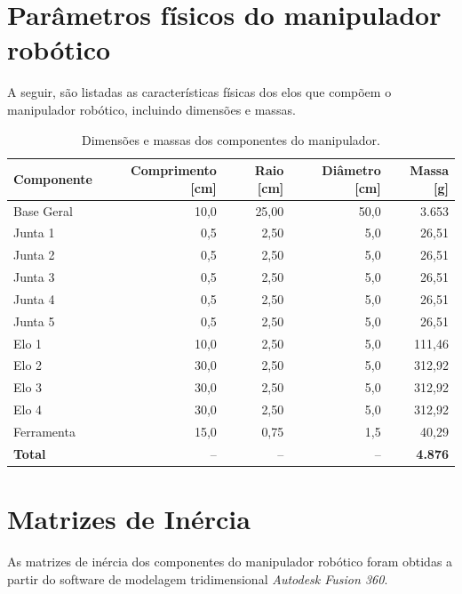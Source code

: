 \section{Parâmetros físicos do manipulador robótico}
\label{ap:ApendiceA}
A seguir, são listadas as características físicas dos elos que compõem o manipulador robótico, incluindo dimensões e massas.


\begin{table}[H]
\centering
{\setlength{\tabcolsep}{6pt} 
\caption{Dimensões e massas dos componentes do manipulador.}
\label{tab:dimensoes_massas_cm_g}
\begin{tabular}{l rrrr}
\hline
\textbf{Componente} & \textbf{Comprimento [cm]} & \textbf{Raio [cm]} & \textbf{Diâmetro [cm]} & \textbf{Massa [g]} \\
\hline
Base Geral   & 10,0   & 25,00  & 50,0  & 3.653   \\
Junta 1      & 0,5  & 2,50   & 5,0   & 26,51  \\
Junta 2      & 0,5  & 2,50   & 5,0   & 26,51  \\
Junta 3      & 0,5  & 2,50   & 5,0   & 26,51  \\
Junta 4      & 0,5  & 2,50  & 5,0   & 26,51  \\
Junta 5      & 0,5  & 2,50   & 5,0   & 26,51  \\
Elo 1        & 10,0   & 2,50   & 5,0   & 111,46 \\
Elo 2        & 30,0   & 2,50   & 5,0   & 312,92 \\
Elo 3        & 30,0   & 2,50   & 5,0   & 312,92 \\
Elo 4        & 30,0   & 2,50   & 5,0   & 312,92 \\
Ferramenta   & 15,0   & 0,75  & 1,5   & 40,29  \\
\hline
\textbf{Total} & -- & -- & -- & \textbf{4.876} \\
\hline
\end{tabular}}
\end{table}


\section{Matrizes de Inércia}
As matrizes de inércia dos componentes do manipulador robótico foram obtidas a partir do software de modelagem tridimensional \emph{Autodesk Fusion 360}. 

